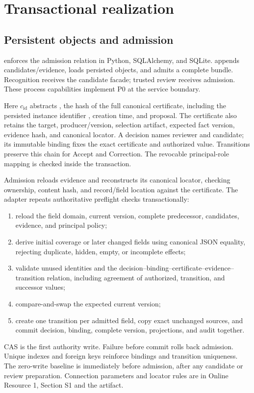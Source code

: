 \section{Transactional realization}
\label{sec:realization}

\subsection{Persistent objects and admission}

\system{} enforces the admission relation in Python, SQLAlchemy, and SQLite.  appends candidates/evidence,  loads persisted objects, and  admits a complete bundle. Recognition receives the candidate facade; trusted review receives admission. These process capabilities implement P0 at the service boundary.

Here $c_{\mathrm{id}}$ abstracts , the hash of the full canonical certificate, including the persisted instance identifier , creation time, and proposal. The certificate also retains the target, producer/version, selection artifact, expected fact version, evidence hash, and canonical locator. A decision names reviewer and candidate; its immutable binding fixes the exact certificate and authorized value. Transitions preserve this chain for Accept and Correction. The revocable principal-role mapping is checked inside the transaction.

Admission reloads evidence and reconstructs its canonical locator, checking ownership, content hash, and record/field location against the certificate. The adapter repeats authoritative preflight checks transactionally:
\begin{enumerate}[leftmargin=*]
\item reload the field domain, current version, complete predecessor, candidates, evidence, and principal policy;
\item derive initial coverage or later changed fields using canonical JSON equality, rejecting duplicate, hidden, empty, or incomplete effects;
\item validate unused identities and the decision--binding--certificate--evidence--transition relation, including agreement of authorized, transition, and successor values;
\item compare-and-swap the expected current version;
\item create one transition per admitted field, copy exact unchanged sources, and commit decision, binding, complete version, projections, and audit together.
\end{enumerate}
CAS is the first authority write. Failure before commit rolls back admission. Unique indexes and foreign keys reinforce bindings and transition uniqueness. The zero-write baseline is immediately before admission, after any candidate or review preparation. Connection parameters and locator rules are in Online Resource 1, Section S1 and the artifact.

